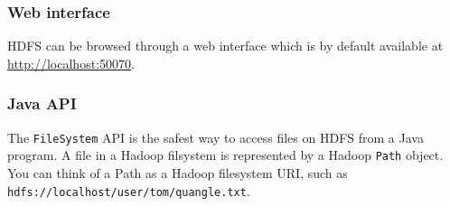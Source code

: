 \documentclass[11pt]{article}
\begin{document}
\subsubsection{Web interface}

HDFS can be browsed through a web interface which is by default
available at \href{http://localhost:50070}{http://localhost:50070}.

\subsubsection{Java API}

The \texttt{FileSystem} API is the safest way to access files on HDFS
from a Java program. A file in a Hadoop filsystem is represented by a
Hadoop \texttt{Path} object. You can think of a Path as a Hadoop
filesystem URI, such as
\texttt{hdfs://localhost/user/tom/quangle.txt}.
\end{document}
